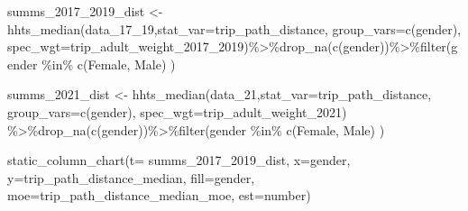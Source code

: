 \documentclass[
  12pt,
]{article}
\newenvironment{Shaded}{\begin{snugshade}}{\end{snugshade}}
\newcommand{\AttributeTok}[1]{\textcolor[rgb]{0.77,0.63,0.00}{#1}}
\newcommand{\FunctionTok}[1]{\textcolor[rgb]{0.00,0.00,0.00}{#1}}
\newcommand{\NormalTok}[1]{#1}
\newcommand{\OtherTok}[1]{\textcolor[rgb]{0.56,0.35,0.01}{#1}}
\newcommand{\SpecialCharTok}[1]{\textcolor[rgb]{0.00,0.00,0.00}{#1}}
\newcommand{\StringTok}[1]{\textcolor[rgb]{0.31,0.60,0.02}{#1}}
\begin{document}
\begin{Shaded}
\begin{Highlighting}[]
\NormalTok{  summs\_2017\_2019\_dist }\OtherTok{\textless{}{-}} \FunctionTok{hhts\_median}\NormalTok{(data\_17\_19,}\AttributeTok{stat\_var=}\StringTok{\textquotesingle{}trip\_path\_distance\textquotesingle{}}\NormalTok{,}
                                        \AttributeTok{group\_vars=}\FunctionTok{c}\NormalTok{(}\StringTok{\textquotesingle{}gender\textquotesingle{}}\NormalTok{),}
                                        \AttributeTok{spec\_wgt=}\StringTok{\textquotesingle{}trip\_adult\_weight\_2017\_2019\textquotesingle{}}\NormalTok{)}\SpecialCharTok{\%\textgreater{}\%}\FunctionTok{drop\_na}\NormalTok{(}\FunctionTok{c}\NormalTok{(}\StringTok{\textquotesingle{}gender\textquotesingle{}}\NormalTok{))}\SpecialCharTok{\%\textgreater{}\%}\FunctionTok{filter}\NormalTok{(gender }\SpecialCharTok{\%in\%} \FunctionTok{c}\NormalTok{(}\StringTok{\textquotesingle{}Female\textquotesingle{}}\NormalTok{, }\StringTok{\textquotesingle{}Male\textquotesingle{}}\NormalTok{) )}

\NormalTok{  summs\_2021\_dist }\OtherTok{\textless{}{-}} \FunctionTok{hhts\_median}\NormalTok{(data\_21,}\AttributeTok{stat\_var=}\StringTok{\textquotesingle{}trip\_path\_distance\textquotesingle{}}\NormalTok{,}
                                        \AttributeTok{group\_vars=}\FunctionTok{c}\NormalTok{(}\StringTok{\textquotesingle{}gender\textquotesingle{}}\NormalTok{),}
                                   \AttributeTok{spec\_wgt=}\StringTok{\textquotesingle{}trip\_adult\_weight\_2021\textquotesingle{}}\NormalTok{) }\SpecialCharTok{\%\textgreater{}\%}\FunctionTok{drop\_na}\NormalTok{(}\FunctionTok{c}\NormalTok{(}\StringTok{\textquotesingle{}gender\textquotesingle{}}\NormalTok{))}\SpecialCharTok{\%\textgreater{}\%}\FunctionTok{filter}\NormalTok{(gender }\SpecialCharTok{\%in\%} \FunctionTok{c}\NormalTok{(}\StringTok{\textquotesingle{}Female\textquotesingle{}}\NormalTok{, }\StringTok{\textquotesingle{}Male\textquotesingle{}}\NormalTok{) )}
  
 
\FunctionTok{static\_column\_chart}\NormalTok{(}\AttributeTok{t=}\NormalTok{ summs\_2017\_2019\_dist, }\AttributeTok{x=}\StringTok{\textquotesingle{}gender\textquotesingle{}}\NormalTok{, }\AttributeTok{y=}\StringTok{\textquotesingle{}trip\_path\_distance\_median\textquotesingle{}}\NormalTok{,  }\AttributeTok{fill=}\StringTok{\textquotesingle{}gender\textquotesingle{}}\NormalTok{, }\AttributeTok{moe=}\StringTok{\textquotesingle{}trip\_path\_distance\_median\_moe\textquotesingle{}}\NormalTok{, }\AttributeTok{est=}\StringTok{\textquotesingle{}number\textquotesingle{}}\NormalTok{)}
\end{Highlighting}
\end{Shaded}
\end{document}
